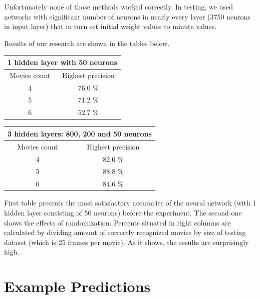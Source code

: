 \documentclass[conference]{IEEEtran}
\begin{document}
    Unfortunately none of those methods worked correctly. In testing, we used networks with significant number of neurons in nearly every layer (3750 neurons in input layer) that in turn set initial weight values to minute values.
    

\vspace{5pt}
    Results of our research are shown in the tables below.
\vspace{5pt}
    
\begin{center}
\begin{tabular}{|| c | c ||} 
\hline
\multicolumn{2}{||c||}{1 hidden layer with 50 neurons} \\
 \hline
 Movies count & Highest precision \\
 \hline
 4 & 76.0 \% \\
 \hline
 5 & 71.2 \% \\ 
 \hline
 6 & 52.7 \% \\ 
 \hline
\end{tabular}
\end{center}

\vspace{5pt}
\begin{center}
\begin{tabular}{|| c | c ||} 
\hline
\multicolumn{2}{||c||}{3 hidden layers: 800, 200 and 50 neurons} \\
 \hline
 Movies count & Highest precision \\
 \hline
 4 & 82.0 \% \\
 \hline
 5 & 88.8 \% \\ 
 \hline
 6 & 84.6 \% \\ 
 \hline
\end{tabular}
\end{center}

\vspace{5pt}
First table presents the most satisfactory accuracies of the neural network (with 1 hidden layer consisting of 50 neurons) before the experiment. The second one shows the effects of randomization. Percents situated in right columns are calculated by dividing amount of correctly recognized movies by size of testing dataset (which is 25 frames per movie). As it shows, the results are surprisingly high.

\vspace{10pt} 
	\section{Example Predictions}
\end{document}
